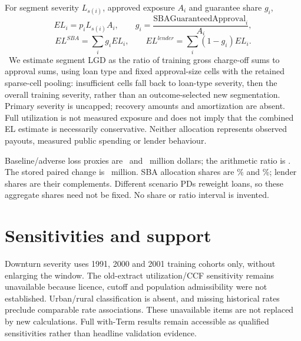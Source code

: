 For segment severity $L_{s(i)}$, approved exposure $A_i$ and guarantee share $g_i$,
\[EL_i=p_i L_{s(i)} A_i,\qquad g_i=\frac{\text{SBAGuaranteedApproval}_i}{A_i},\]
\[EL^{SBA}=\sum_i g_i EL_i,\qquad EL^{lender}=\sum_i(1-g_i)EL_i.\]
\losslabel\ We estimate segment LGD as the ratio of training gross charge-off sums to approval sums, using loan type and fixed approval-size cells with the retained sparse-cell pooling: insufficient cells fall back to loan-type severity, then the overall training severity, rather than an outcome-selected new segmentation. Primary severity is uncapped; recovery amounts and amortization are absent. Full utilization is not measured exposure and does not imply that the combined EL estimate is necessarily conservative. Neither allocation represents observed payouts, measured public spending or lender behaviour.


Baseline/adverse loss proxies are \ElBase\ and \ElAdverse\ million dollars; the arithmetic ratio is \ElRatio. The stored paired change is \ElDiff\ million. SBA allocation shares are \ShareBase\% and \ShareAdverse\%; lender shares are their complements. Different scenario PDs reweight loans, so these aggregate shares need not be fixed. No share or ratio interval is invented.

\section{Sensitivities and support}
Downturn severity uses 1991, 2000 and 2001 training cohorts only, without enlarging the window. The old-extract utilization/CCF sensitivity remains unavailable because licence, cutoff and population admissibility were not established. Urban/rural classification is absent, and missing historical rates preclude comparable rate associations. These unavailable items are not replaced by new calculations. Full with-Term results remain accessible as qualified sensitivities rather than headline validation evidence.

